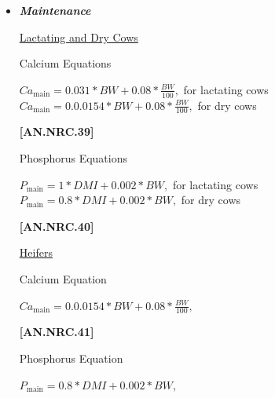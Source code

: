 \begin{refsection}
    \begin{itemize}
        \item \textbf{\textit{Maintenance}} 
        \vspace{0.2cm}
        
        \underline{Lactating and Dry Cows}
\vspace{0.2cm}

Calcium Equations
\begin{center}
    \(Ca_{\text{main}} = 0.031 * BW + 0.08 * \frac{BW}{100},\) for lactating cows\\
    \vspace{0.2cm}
    \(Ca_{\text{main}} = 0.0.0154 * BW + 0.08 * \frac{BW}{100},\) for dry cows
\end{center}

\vspace{0.5cm}
            {\raggedleft \textbf{[AN.NRC.39]}\par}

\vspace{0.5cm}
Phosphorus Equations
\vspace{0.5cm}

\begin{center}
    \(P_{\text{main}} = 1 * DMI + 0.002 * BW, \) for lactating cows\\
    \vspace{0.25cm}
    \(P_{\text{main}} = 0.8 * DMI + 0.002 * BW, \) for dry cows
\end{center}

\vspace{0.5cm}
            {\raggedleft \textbf{[AN.NRC.40]}\par}
\vspace{0.25cm}

        {\underline{Heifers}}
                \vspace{0.2cm}

Calcium Equation
\begin{center}
    \(Ca_{\text{main}} = 0.0.0154 * BW + 0.08 * \frac{BW}{100}, \)
\end{center}

\vspace{0.5cm}
            {\raggedleft \textbf{[AN.NRC.41]}\par}
            \vspace{0.5cm}

Phosphorus Equation
\begin{center}
    \(P_{\text{main}} =  0.8 * DMI + 0.002 * BW, \)
\end{center}


\end{itemize}
\end{refsection}
